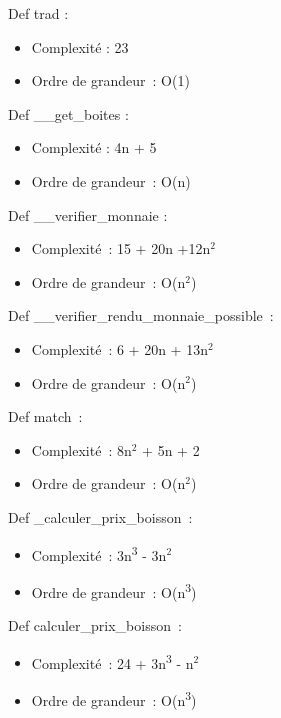 \documentclass[]{article}
\begin{document}
Def trad :

\begin{itemize}
\item
  Complexité : 23
\item
  Ordre de grandeur~: O(1)
\end{itemize}

Def \_\_get\_boites :

\begin{itemize}
\item
  Complexité : 4n + 5
\item
  Ordre de grandeur~: O(n)
\end{itemize}

Def \_\_verifier\_monnaie :

\begin{itemize}
\item
  Complexité~: 15 + 20n +12n\(^{2}\)
\item
  Ordre de grandeur~: O(n\(^{2}\))
\end{itemize}

Def \_\_verifier\_rendu\_monnaie\_possible~:

\begin{itemize}
\item
  Complexité~: 6 + 20n + 13n\(^{2}\)
\item
  Ordre de grandeur~: O(n\(^{2}\))
\end{itemize}

Def match~:

\begin{itemize}
\item
  Complexité~: 8n\(^{2}\) + 5n + 2
\item
  Ordre de grandeur~: O(n\(^{2}\))
\end{itemize}

Def \_calculer\_prix\_boisson~:

\begin{itemize}
\item
  Complexité~: 3n\textsuperscript{3} - 3n\(^{2}\)
\item
  Ordre de grandeur~: O(n\textsuperscript{3})
\end{itemize}

Def calculer\_prix\_boisson~:

\begin{itemize}
\item
  Complexité~: 24 + 3n\textsuperscript{3} - n\(^{2}\)
\item
  Ordre de grandeur~: O(n\textsuperscript{3})
\end{itemize}
\end{document}
